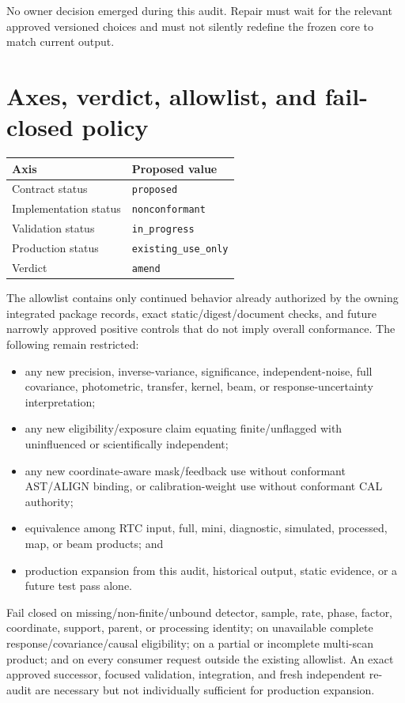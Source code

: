 \documentclass[11pt]{article}
\newcommand{\code}[1]{\nolinkurl{#1}}
\begin{document}
No owner decision emerged during this audit.  Repair must wait for the
relevant approved versioned choices and must not silently redefine the frozen
core to match current output.

\section{Axes, verdict, allowlist, and fail-closed policy}

\begin{center}
\begin{tabular}{ll}
\toprule
Axis & Proposed value\\
\midrule
Contract status & \code{proposed}\\
Implementation status & \code{nonconformant}\\
Validation status & \code{in_progress}\\
Production status & \code{existing_use_only}\\
Verdict & \code{amend}\\
\bottomrule
\end{tabular}
\end{center}

The allowlist contains only continued behavior already authorized by the
owning integrated package records, exact static/digest/document checks, and
future narrowly approved positive controls that do not imply overall
conformance.  The following remain restricted:
\begin{itemize}[leftmargin=*]
\item any new precision, inverse-variance, significance, independent-noise,
full covariance, photometric, transfer, kernel, beam, or response-uncertainty
interpretation;
\item any new eligibility/exposure claim equating finite/unflagged with
uninfluenced or scientifically independent;
\item any new coordinate-aware mask/feedback use without conformant AST/ALIGN
binding, or calibration-weight use without conformant CAL authority;
\item equivalence among RTC input, full, mini, diagnostic, simulated,
processed, map, or beam products; and
\item production expansion from this audit, historical output, static
evidence, or a future test pass alone.
\end{itemize}

Fail closed on missing/non-finite/unbound detector, sample, rate, phase,
factor, coordinate, support, parent, or processing identity; on unavailable
complete response/covariance/causal eligibility; on a partial or incomplete
multi-scan product; and on every consumer request outside the existing
allowlist.  An exact approved successor, focused validation, integration, and
fresh independent re-audit are necessary but not individually sufficient for
production expansion.
\end{document}
